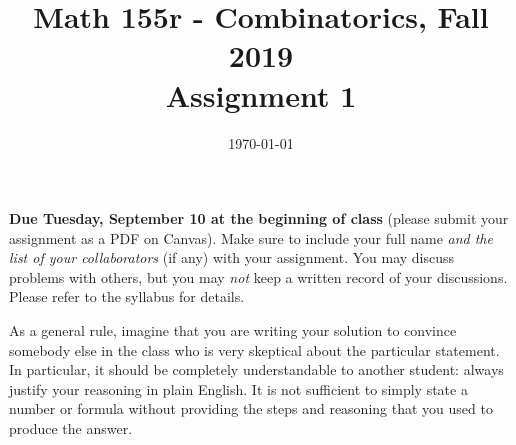 \documentclass{amsart}
\title[Math 155r, Fall 2019: assignment 1]{Math 155r - Combinatorics, Fall 2019 \\ Assignment 1}
\date{\today}
\theoremstyle{definition}
\begin{document}

\maketitle

\textbf{Due Tuesday, September 10 at the beginning of class} (please submit your assignment as a PDF on Canvas). Make sure to include your full name \emph{and the list of your collaborators} (if any) with your assignment. You may discuss problems with others, but you may \emph{not} keep a written record of your discussions. Please refer to the syllabus for details.

As a general rule, imagine that you are writing your solution to convince somebody else in the class who is very skeptical about the particular statement. In particular, it should be completely understandable to another student: always justify your reasoning in plain English. It is not sufficient to simply state a number or formula without providing the steps and reasoning that you used to produce the answer.
\end{document}
